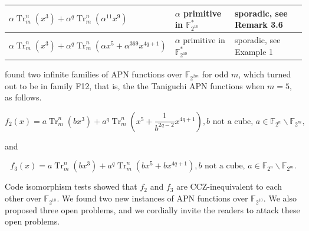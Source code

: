 \documentclass[10pt]{article}
\begin{document}
\begin{table}[h]
\begin{center}
\begin{tabular}{|l|l|l|}
\hline
$\alpha \operatorname{Tr}_{m}^{n}\left(x^{3}\right)+\alpha^{q} \operatorname{Tr}_{m}^{n}\left(\alpha^{11} x^{9}\right)$ & $\alpha$ primitive in $\mathbb{F}_{2^{10}}^{*}$ & sporadic, see Remark 3.6 \\
\hline
$\alpha \operatorname{Tr}_{m}^{n}\left(x^{3}\right)+\alpha^{q} \operatorname{Tr}_{m}^{n}\left(\alpha x^{5}+\alpha^{369} x^{4 q+1}\right)$ & $\alpha$ primitive in $\mathbb{F}_{2^{10}}^{*}$ & sporadic, see Example 1 \\
\hline
\end{tabular}
\end{center}
\end{table}

found two infinite families of APN functions over $\mathbb{F}_{2^{2 m}}$ for odd $m$, which turned out to be in family F12, that is, the the Taniguchi APN functions when $m=5$, as follows.

$$
f_{2}(x)=a \operatorname{Tr}_{m}^{n}\left(b x^{3}\right)+a^{q} \operatorname{Tr}_{m}^{n}\left(x^{5}+\frac{1}{b^{2 q-2}} x^{4 q+1}\right), b \text { not a cube, } a \in \mathbb{F}_{2^{n}} \backslash \mathbb{F}_{2^{m}},
$$

and

$$
f_{3}(x)=a \operatorname{Tr}_{m}^{n}\left(b x^{3}\right)+a^{q} \operatorname{Tr}_{m}^{n}\left(b x^{5}+b x^{4 q+1}\right), b \text { not a cube, } a \in \mathbb{F}_{2^{n}} \backslash \mathbb{F}_{2^{m}} .
$$

Code isomorphism tests showed that $f_{2}$ and $f_{3}$ are CCZ-inequivalent to each other over $\mathbb{F}_{2^{10}}$. We found two new instances of APN functions over $\mathbb{F}_{2^{10}}$. We also proposed three open problems, and we cordially invite the readers to attack these open problems.
\end{document}

